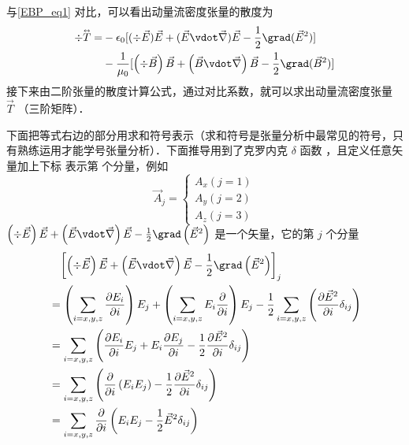 与\autoref{EBP_eq1} 对比，可以看出动量流密度张量的散度为
\begin{equation}
\begin{aligned}
\div \mathord{\buildrel{\lower3pt\hbox{$\scriptscriptstyle\leftrightarrow$}} 
\over T}  =  &- {\epsilon_0} [ ( \div \vec E )\vec E + (\vec E\vdot\vec\nabla )\vec E - \frac{1}{2}\grad ( {\vec E}^2 ) ]\\
&- \frac{1}{\mu _0} [ \left( {\div \vec B} \right)\vec B + \left( {\vec B\vdot\vec\nabla } \right)\vec B - \frac{1}{2}\grad ({\vec B}^2 ) ]
\end{aligned}
\end{equation} 
接下来由二阶张量的散度计算公式，通过对比系数，就可以求出动量流密度张量 $\vec T$ （三阶矩阵）．

下面把等式右边的部分用求和符号表示（求和符号是张量分析中最常见的符号，只有熟练运用才能学号张量分析）．下面推导用到了克罗内克 $\delta$ 函数 %
，且定义任意矢量加上下标 表示第 个分量，例如
\begin{equation}
{\vec A_j} = \left\{ \begin{array}{l}
{A_x} \left( {j = 1} \right)\\
{A_y}     \left( {j = 2} \right)\\
{A_z}      \left( {j = 3} \right)
\end{array} \right.
\end{equation} 
 $\left( {\div \vec E} \right)\vec E + \left( {\vec E\vdot\vec\nabla } \right)\vec E - \frac{1}{2}\grad \left( {{{\vec E}^2}} \right)$ 是一个矢量，它的第 $j$ 个分量
\begin{equation}
\begin{aligned}
&\phantom{={}} {\left[ {\left( {\div \vec E} \right)\vec E + \left( {\vec E\vdot\vec\nabla } \right)\vec E - \frac{1}{2}\grad \left( {{{\vec E}^2}} \right)} \right]_j}\\
&= \left( {\sum\limits_{i = x,y,z} {\frac{{\partial {E_i}}}{{\partial i}}} } \right){E_j} + \left( {\sum\limits_{i = x,y,z} {{E_i}\frac{\partial }{{\partial i}}} } \right){E_j} - \frac{1}{2}\sum\limits_{i = x,y,z} {\left( {\frac{{\partial {{\vec E}^2}}}{{\partial i}}{\delta _{ij}}} \right)} \\
&= \sum\limits_{i = x,y,z} {\left( {\frac{{\partial {E_i}}}{{\partial i}}{E_j} + {E_i}\frac{{\partial {E_j}}}{{\partial i}} - \frac{1}{2}\frac{\partial\vec E^2}{{\partial i}}{\delta _{ij}}} \right)} \\
&= \sum\limits_{i = x,y,z} {\left( {\frac{\partial }{{\partial i}}\left( {{E_i}{E_j}} \right) - \frac{1}{2}\frac{{\partial {{\vec E}^2}}}{{\partial i}}{\delta _{ij}}} \right)} \\
&= \sum\limits_{i = x,y,z} {\frac{\partial }{{\partial i}}\left( {{E_i}{E_j} - \frac{1}{2}{{\vec E}^2}{\delta _{ij}}} \right)} 
\end{aligned}
\end{equation} 
